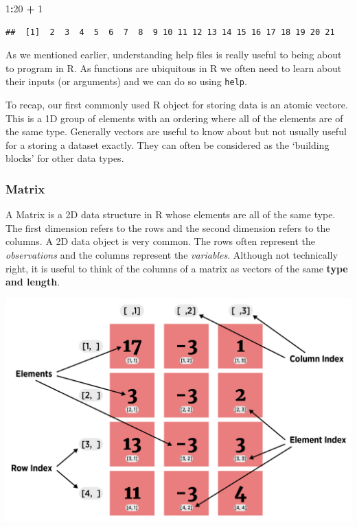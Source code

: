 \documentclass[
]{book}
\newenvironment{Shaded}{\begin{snugshade}}{\end{snugshade}}
\newcommand{\DecValTok}[1]{\textcolor[rgb]{0.00,0.00,0.81}{#1}}
\newcommand{\OperatorTok}[1]{\textcolor[rgb]{0.81,0.36,0.00}{\textbf{#1}}}
\newcommand{\StringTok}[1]{\textcolor[rgb]{0.31,0.60,0.02}{#1}}
\theoremstyle{definition}
\theoremstyle{definition}
\theoremstyle{definition}
\theoremstyle{remark}
\begin{document}
\begin{Shaded}
\begin{Highlighting}[]
\DecValTok{1}\OperatorTok{:}\DecValTok{20} \OperatorTok{+}\StringTok{ }\DecValTok{1}
\end{Highlighting}
\end{Shaded}

\begin{verbatim}
##  [1]  2  3  4  5  6  7  8  9 10 11 12 13 14 15 16 17 18 19 20 21
\end{verbatim}

As we mentioned earlier, understanding help files is really useful to being about to program in R. As functions are ubiquitous in R we often need to learn about their inputs (or arguments) and we can do so using \texttt{help}.

To recap, our first commonly used R object for storing data is an atomic vectore. This is a 1D group of elements with an ordering where all of the elements are of the same type. Generally vectors are useful to know about but not usually useful for a storing a dataset exactly. They can often be considered as the `building blocks' for other data types.

\hypertarget{matrix-1}{%
\subsubsection{Matrix}\label{matrix-1}}

A Matrix is a 2D data structure in R whose elements are all of the same type. The first dimension refers to the rows and the second dimension refers to the columns. A 2D data object is very common. The rows often represent the \emph{observations} and the columns represent the \emph{variables}. Although not technically right, it is useful to think of the columns of a matrix as vectors of the same \textbf{type and length}.

\begin{center}\includegraphics[width=0.75\linewidth]{img/matrixVisualF} \end{center}
\end{document}
